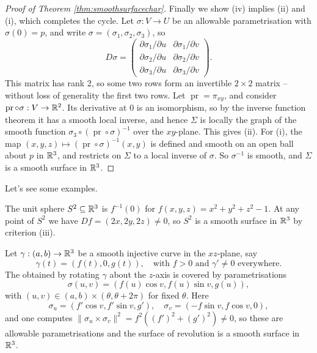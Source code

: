 \documentclass[a4paper]{scrartcl}
\begin{document}
\begin{proof}[Proof of Theorem \ref{thm:smoothsurfacechar}]
    Finally we show (iv) implies (ii) and (i), which completes the cycle. Let $\sigma: V \rightarrow U$ be an allowable parametrisation with $\sigma(0) = p$, and write $\sigma = (\sigma_1, \sigma_2, \sigma_3)$, so
    $$
    D \sigma = \begin{pmatrix}
        \partial \sigma_1/\partial u & \partial \sigma_1/\partial v \\
        \partial \sigma_2/\partial u & \partial \sigma_2/\partial v \\
        \partial \sigma_3/\partial u & \partial \sigma_3/\partial v
    \end{pmatrix}.
    $$
    This matrix has rank 2, so some two rows form an invertible $2 \times 2$ matrix -- without loss of generality the first two rows. Let $\operatorname{pr} = \pi_{xy}$, and consider $\operatorname{pr} \circ \sigma: V \rightarrow \mathbb{R}^2$. Its derivative at $0$ is an isomorphism, so by the inverse function theorem it has a smooth local inverse, and hence $\Sigma$ is locally the graph of the smooth function $\sigma_3 \circ (\operatorname{pr} \circ \sigma)^{-1}$ over the $xy$-plane. This gives (ii). For (i), the map $(x, y, z) \mapsto (\operatorname{pr} \circ \sigma)^{-1}(x, y)$ is defined and smooth on an open ball about $p$ in $\mathbb{R}^3$, and restricts on $\Sigma$ to a local inverse of $\sigma$. So $\sigma^{-1}$ is smooth, and $\Sigma$ is a smooth surface in $\mathbb{R}^3$.
\end{proof}

Let's see some examples.

\begin{example}
    The unit sphere $S^2 \subseteq \mathbb{R}^3$ is $f^{-1}(0)$ for $f(x, y, z) = x^2 + y^2 + z^2 - 1$. At any point of $S^2$ we have $Df = (2x, 2y, 2z) \neq 0$, so $S^2$ is a smooth surface in $\mathbb{R}^3$ by criterion (iii).
\end{example}

\begin{example}
    Let $\gamma: (a, b) \rightarrow \mathbb{R}^3$ be a smooth injective curve in the $xz$-plane, say
    $$
    \gamma(t) = (f(t), 0, g(t)), \quad \text{with } f > 0 \text{ and } \gamma' \neq 0 \text{ everywhere}.
    $$
    The  obtained by rotating $\gamma$ about the $z$-axis is covered by parametrisations
    $$
    \sigma(u, v) = (f(u) \cos v, f(u) \sin v, g(u)),
    $$
    with $(u, v) \in (a, b) \times (\theta, \theta + 2\pi)$ for fixed $\theta$. Here
    $$
    \sigma_u = (f' \cos v, f' \sin v, g'), \quad \sigma_v = (-f \sin v, f \cos v, 0),
    $$
    and one computes $\|\sigma_u \times \sigma_v\|^2 = f^2 ((f')^2 + (g')^2) \neq 0$, so these are allowable parametrisations and the surface of revolution is a smooth surface in $\mathbb{R}^3$.
\end{example}
\end{document}
